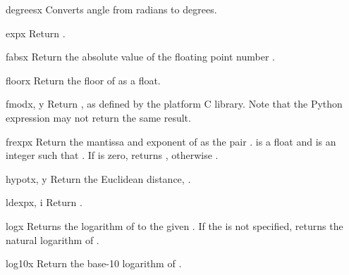 \begin{funcdesc}{degrees}{x}
Converts angle  from radians to degrees.
\end{funcdesc}

\begin{funcdesc}{exp}{x}
Return .
\end{funcdesc}

\begin{funcdesc}{fabs}{x}
Return the absolute value of the floating point number .
\end{funcdesc}

\begin{funcdesc}{floor}{x}
Return the floor of  as a float.
\end{funcdesc}

\begin{funcdesc}{fmod}{x, y}
Return , as defined by the platform C library.
Note that the Python expression  may not return
the same result.
\end{funcdesc}

\begin{funcdesc}{frexp}{x}
Return the mantissa and exponent of  as the pair
.   is a float and  is an
integer such that .
If  is zero, returns , otherwise
.
\end{funcdesc}

\begin{funcdesc}{hypot}{x, y}
Return the Euclidean distance, .
\end{funcdesc}

\begin{funcdesc}{ldexp}{x, i}
Return .
\end{funcdesc}

\begin{funcdesc}{log}{x}
Returns the logarithm of  to the given .
If the  is not specified, returns the natural logarithm of .
\end{funcdesc}

\begin{funcdesc}{log10}{x}
Return the base-10 logarithm of .
\end{funcdesc}

